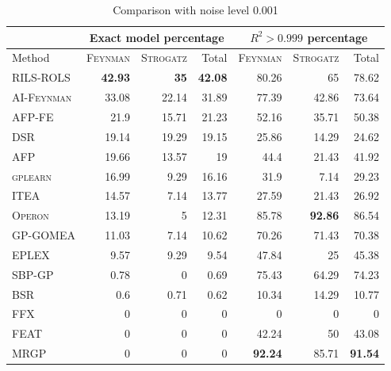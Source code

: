 \documentclass{bmcart}
\begin{document}
\begin{table}[!h]
	\caption{Comparison with noise level 0.001}\label{tab:comp_noise0001}
	\centering
	\begin{tabular}{l|rrr|rrr} \hline
		& \multicolumn{3}{c|}{Exact model percentage} & \multicolumn{3}{c}{$R^2 > 0.999$ percentage}\\ \hline
		Method &  \textsc{Feynman} & \textsc{Strogatz} & Total &  \textsc{Feynman} & \textsc{Strogatz} & Total \\ \hline
		\textsc{RILS-ROLS}&\bf{42.93}&\bf{35}&\bf{42.08}&80.26&65&78.62\\
		\textsc{AI-Feynman}&33.08&22.14&31.89&77.39&42.86&73.64\\
		\textsc{AFP-FE}&21.9&15.71&21.23&52.16&35.71&50.38\\
		\textsc{DSR}&19.14&19.29&19.15&25.86&14.29&24.62\\
		\textsc{AFP}&19.66&13.57&19&44.4&21.43&41.92\\
		\textsc{gplearn}&16.99&9.29&16.16&31.9&7.14&29.23\\
		\textsc{ITEA}&14.57&7.14&13.77&27.59&21.43&26.92\\
		\textsc{Operon}&13.19&5&12.31&85.78&\bf{92.86}&86.54\\
		\textsc{GP-GOMEA}&11.03&7.14&10.62&70.26&71.43&70.38\\
		\textsc{EPLEX}&9.57&9.29&9.54&47.84&25&45.38\\
		\textsc{SBP-GP}&0.78&0&0.69&75.43&64.29&74.23\\
		\textsc{BSR}&0.6&0.71&0.62&10.34&14.29&10.77\\
		\textsc{FFX}&0&0&0&0&0&0\\
		\textsc{FEAT}&0&0&0&42.24&50&43.08\\
		\textsc{MRGP}&0&0&0&\bf{92.24}&85.71&\bf{91.54}\\
		\hline
	\end{tabular}
\end{table}
\end{document}
